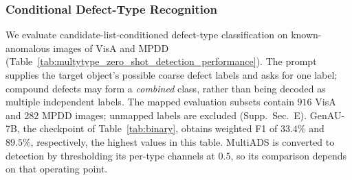 \subsubsection{Conditional Defect-Type Recognition}
We evaluate candidate-list-conditioned defect-type classification on known-anomalous images of VisA and MPDD (Table~\ref{tab:multytype_zero_shot_detection_performance}). The prompt supplies the target object's possible coarse defect labels and asks for one label; compound defects may form a \emph{combined} class, rather than being decoded as multiple independent labels. The mapped evaluation subsets contain $916$ VisA and $282$ MPDD images; unmapped labels are excluded (Supp.~Sec.~E).
GenAU-7B, the checkpoint of Table~\ref{tab:binary}, obtains weighted F1 of $33.4\%$ and $89.5\%$, respectively, the highest values in this table. MultiADS is converted to detection by thresholding its per-type channels at $0.5$, so its comparison depends on that operating point.

